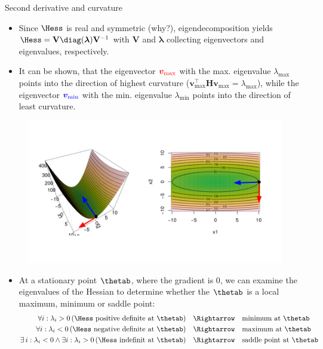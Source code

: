 \begin{vbframe}{Second derivative and curvature}
\begin{itemize}
  \item Since $\Hess$ is real and symmetric (why?), eigendecomposition yields
  $\Hess = \mathbf{V} \mathbf{\diag(\boldsymbol{\lambda})} \mathbf{V}^{-1}$
  with $\mathbf{V}$ and $\boldsymbol{\lambda}$ collecting eigenvectors and eigenvalues, respectively.
  \item It can be shown, that the eigenvector $\textcolor{red}{\bm{v}_{\text{max}}}$ with the max. eigenvalue $\lambda_{\text{max}}$ points into the direction of highest curvature ($\bm{v}_{\text{max}}^\top \bm{H} \bm{v}_{\text{max}} = \lambda_{\text{max}}$), while the eigenvector $\textcolor{blue}{\bm{v}_{\text{min}}}$ with the min. eigenvalue $\lambda_{\text{min}}$ points into the direction of least curvature. 
\end{itemize}

\vspace*{-0.5cm}

\begin{figure}
  \begin{center}
    \includegraphics[width=.7\textwidth]{plots/curvature2.png}
  \end{center}
\end{figure}

\framebreak 

\begin{itemize}
  \item At a stationary point $\thetab$, where the gradient is 0, we can examine the eigenvalues of the Hessian to determine whether the $\thetab$ is a local maximum, minimum or saddle point: 
  \vspace{-0.3cm}
  \begin{align*} 
  \quad\forall i: \lambda_i > 0  \, (\Hess \text{ positive definite at $\thetab$}) &\quad\Rightarrow\quad \text{minimum at $\thetab$} \\
  \quad\forall i: \lambda_i < 0 \, (\Hess \text{ negative definite at $\thetab$}) &\quad\Rightarrow\quad \text{maximum at $\thetab$}\\
  \exists\, i: \lambda_i < 0 \land  \exists i: \lambda_i > 0  \,(\Hess \text{ indefinit at $\thetab$}) &\quad\Rightarrow\quad \mbox{saddle point at $\thetab$}
  \end{align*}
\end{itemize}
   \begin{figure}
 \captionsetup{font=footnotesize,labelfont=footnotesize, labelfont = bf}


\end{figure}
\end{vbframe}
